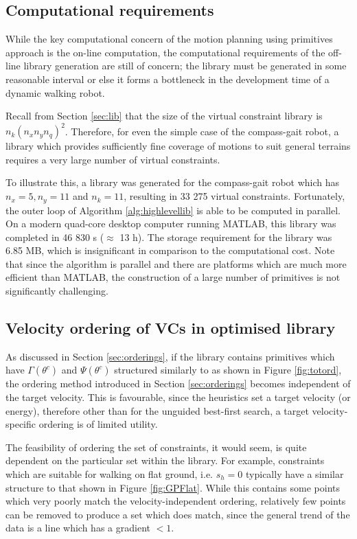 \subsection{Computational requirements} \label{sec:vcgenres}
While the key computational concern of the motion planning using primitives approach is the on-line computation, the computational requirements of the off-line library generation are still of concern; the library must be generated in some reasonable interval or else it forms a bottleneck in the development time of a dynamic walking robot.

Recall from Section \ref{sec:lib} that the size of the virtual constraint library is $n_k(n_xn_yn_q)^2$. Therefore, for even the simple case of the compass-gait robot, a library which provides sufficiently fine coverage of motions to suit general terrains requires a very large number of virtual constraints.

To illustrate this, a library was generated for the compass-gait robot which has $n_x=5,n_y=11$ and $n_k=11$, resulting in 33 275 virtual constraints. Fortunately, the outer loop of Algorithm \ref{alg:highlevellib} is able to be computed in parallel. On a modern quad-core desktop computer running MATLAB, this library was completed in 46 830 s ($\approx$ 13 h). The storage requirement for the library was 6.85 MB, which is insignificant in comparison to the computational cost. Note that since the algorithm is parallel and there are platforms which are much more efficient than MATLAB, the construction of a large number of primitives is not significantly challenging.

\subsection{Velocity ordering of VCs in optimised library}
As discussed in Section \ref{sec:orderings}, if the library contains primitives which have $\Gamma(\theta^c)$ and $\Psi(\theta^c)$ structured similarly to as shown in Figure \ref{fig:totord}, the ordering method introduced in Section \ref{sec:orderings} becomes independent of the target velocity. This is favourable, since the heuristics set a target velocity (or energy), therefore other than for the unguided best-first search, a target velocity-specific ordering is of limited utility.

The feasibility of ordering the set of constraints, it would seem, is quite dependent on the particular set within the library. For example, constraints which are suitable for walking on flat ground, i.e. $s_h=0$ typically have a similar structure to that shown in Figure \ref{fig:GPFlat}. While this contains some points which very poorly match the velocity-independent ordering, relatively few points can be removed to produce a set which does match, since the general trend of the data is a line which has a gradient $<1$.

